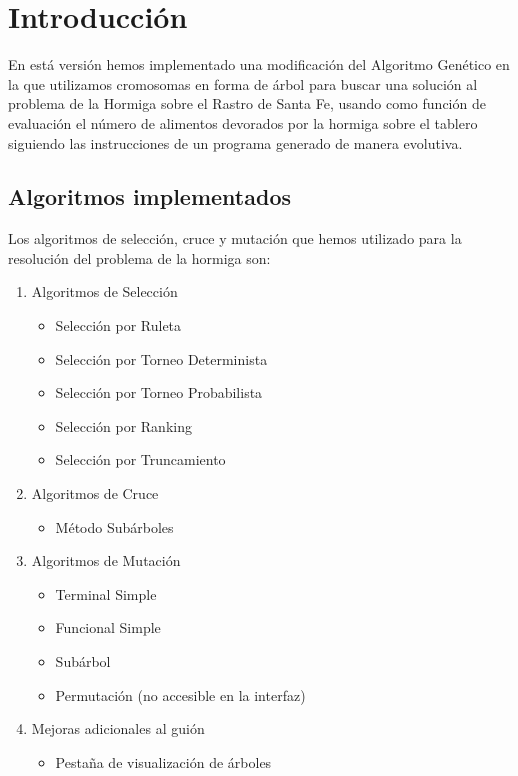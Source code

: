 \documentclass{article}
\begin{document}
\newpage
\section{Introducción}
En está versión hemos implementado una modificación del Algoritmo Genético en la que utilizamos cromosomas en forma de árbol para buscar una solución al problema de la Hormiga sobre el Rastro de Santa Fe, usando como función de evaluación el número de alimentos devorados por la hormiga sobre el tablero siguiendo las instrucciones de un programa generado de manera evolutiva.

\subsection{Algoritmos implementados}
Los algoritmos de selección, cruce y mutación que hemos utilizado para la resolución del problema de la hormiga son:


\begin{enumerate}
	\item Algoritmos de Selección
		\begin{itemize}
			\item Selección por Ruleta
			\item Selección por Torneo Determinista
			\item Selección por Torneo Probabilista
			\item Selección por Ranking
			\item Selección por Truncamiento
		\end{itemize}
	\item Algoritmos de Cruce
		\begin{itemize}
			\item Método Subárboles
		\end{itemize}
	\item Algoritmos de Mutación
		\begin{itemize}
			\item Terminal Simple
			\item Funcional Simple
			\item Subárbol
			\item Permutación (no accesible en la interfaz)
		\end{itemize}
	\item Mejoras adicionales al guión
		\begin{itemize}
			\item Pestaña de visualización de árboles
		\end{itemize}
\end{enumerate}
\newpage
\end{document}
